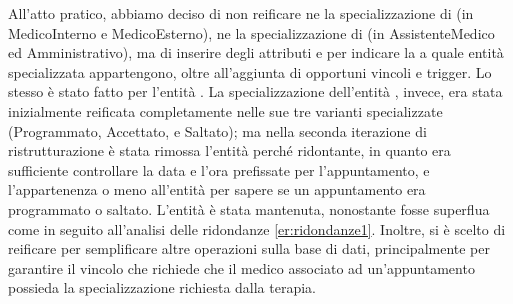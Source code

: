 \documentclass[11pt]{article}
\begin{document}
All'atto pratico, abbiamo deciso di non reificare ne la specializzazione di  (in MedicoInterno e MedicoEsterno), ne la specializzazione di  (in AssistenteMedico ed Amministrativo), ma di inserire degli attributi  e  per indicare la a quale entità specializzata appartengono, oltre all'aggiunta di opportuni vincoli e trigger. Lo stesso è stato fatto per l'entità .
La specializzazione dell'entità , invece, era stata inizialmente reificata completamente nelle sue tre varianti specializzate (Programmato, Accettato, e Saltato); ma nella seconda iterazione di ristrutturazione è stata rimossa l'entità  perché ridontante, in quanto era sufficiente controllare la data e l'ora prefissate per l'appuntamento, e l'appartenenza o meno all'entità  per sapere se un appuntamento era programmato o saltato. L'entità  è stata mantenuta, nonostante fosse superflua come  in seguito all'analisi delle ridondanze \ref{er:ridondanze1}. Inoltre, si è scelto di reificare  per semplificare altre operazioni sulla base di dati, principalmente per garantire il vincolo che richiede che il medico associato ad un'appuntamento possieda la specializzazione richiesta dalla terapia.
\end{document}
